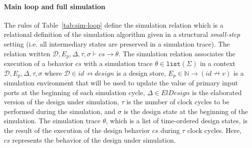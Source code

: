 
  





\paragraph{Main loop and full simulation}



The rules of Table~\ref{tab:sim-loop} define the \hvhdl{} simulation
relation which is a relational definition of the simulation algorithm
given in a structural \textit{small-step} setting (i.e. all
intermediary states are preserved in a simulation trace).  The
relation written
$\mathcal{D},E_p,\Delta,\tau,\sigma\vdash{}cs\rightarrow\theta$. The
\hvhdl{} simulation relation associates the execution of a behavior
$cs$ with a simulation trace $\theta\in\mathtt{list}(\Sigma)$ in a
context $\mathcal{D},E_p,\Delta,\tau,\sigma$ where
$\mathcal{D}\in{}id\nrightarrow{}design$ is a design store,
$E_p\in\mathbb{N}\rightarrow(id\nrightarrow{}v)$ is a simulation
environment that will be used to update the value of primary input
ports at the beginning of each simulation cycle, $\Delta\in{}ElDesign$
is the elaborated version of the design under simulation, $\tau$ is
the number of clock cycles to be performed during the simulation, and
$\sigma$ is the design state at the beginning of the simulation. The
simulation trace $\theta$, which is a list of time-ordered design
states, is the result of the execution of the design behavior $cs$
during $\tau$ clock cycles. Here, $cs$ represents the behavior of the
\hvhdl{} design under simulation.

